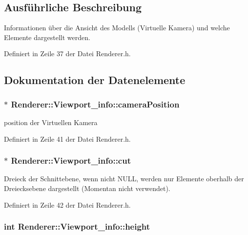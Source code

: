 \subsection{Ausführliche Beschreibung}
Informationen über die Ansicht des Modells (Virtuelle Kamera) und welche Elemente dargestellt werden. 

Definiert in Zeile 37 der Datei Renderer.\-h.



\subsection{Dokumentation der Datenelemente}
\hypertarget{structRenderer_1_1Viewport__info_aa6b5d9d9dbde8c74e25af98680b7ccce}{
\subsubsection[{camera\-Position}]{$\ast$ Renderer\-::\-Viewport\-\_\-info\-::camera\-Position}}\label{structRenderer_1_1Viewport__info_aa6b5d9d9dbde8c74e25af98680b7ccce}


position der Virtuellen Kamera 



Definiert in Zeile 41 der Datei Renderer.\-h.

\hypertarget{structRenderer_1_1Viewport__info_af6fe77b0bf872e7d65079bb58e9e8cce}{
\subsubsection[{cut}]{$\ast$ Renderer\-::\-Viewport\-\_\-info\-::cut}}\label{structRenderer_1_1Viewport__info_af6fe77b0bf872e7d65079bb58e9e8cce}


Dreieck der Schnittebene, wenn nicht N\-U\-L\-L, werden nur Elemente oberhalb der Dreiecksebene dargestellt (Momentan nicht verwendet). 



Definiert in Zeile 42 der Datei Renderer.\-h.

\hypertarget{structRenderer_1_1Viewport__info_acd3f381981791f2b012129fe54aee39c}{
\subsubsection[{height}]{\setlength{\rightskip}{0pt plus 5cm}int Renderer\-::\-Viewport\-\_\-info\-::height}}\label{structRenderer_1_1Viewport__info_acd3f381981791f2b012129fe54aee39c}


